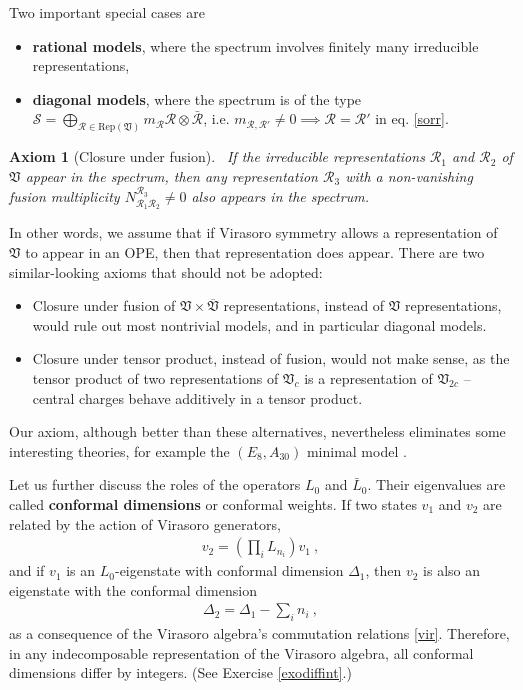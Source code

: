 \documentclass[12pt, a4paper, notitlepage, twoside]{report}
\numberwithin{equation}{section}
\theoremstyle{break}
\newtheorem{hyp}{Axiom}[chapter]
\begin{document}
Two important special cases are
\begin{itemize}
\item \textbf{\boldmath rational models}, where the spectrum involves finitely many irreducible representations,
 \item \textbf{\boldmath diagonal models}, where the spectrum is of the type $\mathcal{S}=\bigoplus_{\mathcal{R}\in \text{Rep}(\mathfrak{V})} m_\mathcal{R} \mathcal{R}\otimes \bar{\mathcal{R}}$, i.e. $m_{\mathcal{R},\mathcal{R}'}\neq 0 \implies \mathcal{R}=\mathcal{R}'$ in eq. \eqref{sorr}.
\end{itemize}

\begin{hyp}[Closure under fusion]
~\label{ax:cuf}
If the irreducible representations $\mathcal{R}_1$ and $\mathcal{R}_2$ of $\mathfrak{V}$ appear in the spectrum, then any representation $\mathcal{R}_3$ with a non-vanishing fusion multiplicity $N_{\mathcal{R}_1\mathcal{R}_2}^{\mathcal{R}_3}\neq 0$ also appears in the spectrum. 
\end{hyp} 
\noindent
In other words, we assume that if Virasoro symmetry allows a representation of $\mathfrak{V}$ to appear in an OPE, then that representation does appear.
There are two similar-looking axioms that should not be adopted:
\begin{itemize}
 \item Closure under fusion of $\mathfrak{V}\times \overline{\mathfrak{V}}$ representations, instead of $\mathfrak{V}$ representations, would rule out most nontrivial models, and in particular diagonal models. 
\item Closure under tensor product, instead of fusion, would not make sense, as the tensor product of two representations of $\mathfrak{V}_c$ is a representation of $\mathfrak{V}_{2c}$ -- central charges behave additively in a tensor product. 
\end{itemize}
Our axiom, although better than these alternatives, nevertheless eliminates some interesting theories, for example the $(E_8,A_{30})$ minimal model \cite{fms97}.

Let us further discuss the roles of the operators $L_0$ and $\bar L_0$. Their eigenvalues are called \textbf{\boldmath conformal dimensions} or conformal weights. If 
two states $v_1$ and $v_2$ are related by the action of Virasoro generators,
\begin{align}
 v_2 = \left(\prod_i L_{n_i}\right) v_1\ ,
\label{vovt}
\end{align}
and if $v_1$ is an $L_0$-eigenstate with conformal dimension $\Delta_1$, then $v_2$ is also an eigenstate with the conformal dimension
\begin{align}
 \Delta_2 = \Delta_1 - \sum_i n_i\ ,
\label{ddsn}
\end{align}
as a consequence of the Virasoro algebra's commutation relations \eqref{vir}. Therefore, in any indecomposable representation of the Virasoro algebra, all conformal dimensions differ by integers. (See Exercise \ref{exodiffint}.)
\end{document}
